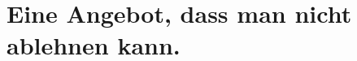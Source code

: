 \documentclass{include/pnp}
\begin{document}

	\TableOfContents


	\MainMatter

	\chapter[Im Ratshaus]{Eine Angebot, dass man nicht ablehnen kann.}
\end{document}
